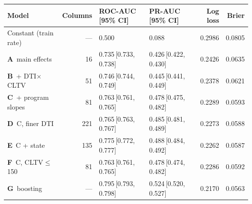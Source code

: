 \begin{tabular}{@{}lrllrr@{}}
\toprule
Model & Columns & ROC-AUC [95\% CI] & PR-AUC [95\% CI] & Log loss & Brier \\
\midrule
Constant (train rate) & --- & 0.500 & 0.088 & 0.2986 & 0.0805 \\
\textbf{A}\ main effects & 16 & 0.735\,[0.733, 0.738] & 0.426\,[0.422, 0.430] & 0.2426 & 0.0635 \\
\textbf{B}\ + DTI$\times$CLTV & 51 & 0.746\,[0.744, 0.749] & 0.445\,[0.441, 0.449] & 0.2378 & 0.0621 \\
\textbf{C}\ + program slopes & 81 & 0.763\,[0.761, 0.765] & 0.478\,[0.475, 0.482] & 0.2289 & 0.0593 \\
\textbf{D}\ C, finer DTI & 221 & 0.765\,[0.763, 0.767] & 0.485\,[0.481, 0.489] & 0.2273 & 0.0588 \\
\textbf{E}\ C + state & 135 & 0.775\,[0.772, 0.777] & 0.488\,[0.484, 0.492] & 0.2262 & 0.0587 \\
\textbf{F}\ C, CLTV$\leq$150 & 81 & 0.763\,[0.761, 0.765] & 0.478\,[0.474, 0.482] & 0.2286 & 0.0592 \\
\textbf{G}\ boosting & --- & 0.795\,[0.793, 0.798] & 0.524\,[0.520, 0.527] & 0.2170 & 0.0563 \\
\bottomrule
\end{tabular}
